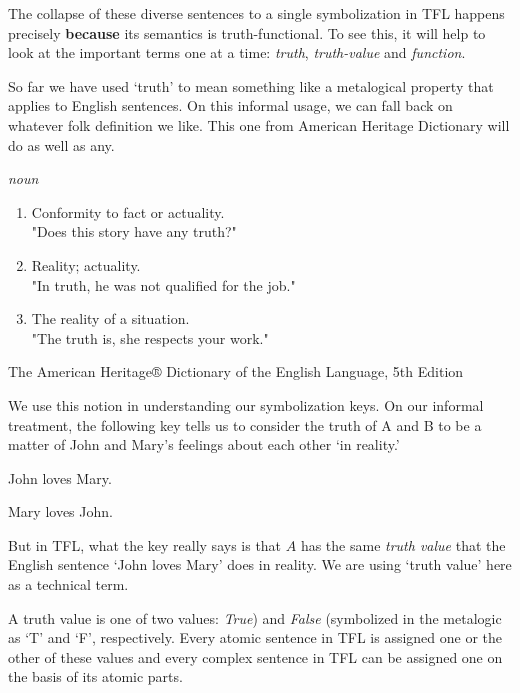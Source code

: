 The collapse of these diverse sentences to a single symbolization in TFL happens
precisely \textbf{because} its semantics is truth-functional. To see this, it will
help to look at the important terms one at a time: \emph{truth}, \emph{truth-value}
and \emph{function}.

So far we have used `truth' to mean something like a metalogical property that applies to
English sentences. On this informal usage, we can fall back on whatever folk definition we
like. This one from American Heritage Dictionary will do as well as any.

\begin{definition} \emph{noun}
  \begin{enumerate}
  \item Conformity to fact or actuality. \\ "Does this story have any truth?"
  \item Reality; actuality. \\ "In truth, he was not qualified for the job."
  \item The reality of a situation. \\ "The truth is, she respects your work."
  \end{enumerate}
  The American Heritage® Dictionary of the English Language, 5th Edition 
\end{definition}

We use this notion in understanding our symbolization keys. On our informal
treatment, the following key tells us to consider the truth of A and B to be a
matter of John and Mary's feelings about each other `in reality.'

\begin{argument}
\item[A:] John loves Mary.
\item[B:] Mary loves John.
\end{argument}

But in TFL, what the key really says is that $A$ has the same \emph{truth value}
that the English sentence `John loves Mary' does in reality. We are using `truth
value' here as a technical term.

\begin{definition}
  A truth value is one of two values: \emph{True}) and \emph{False} (symbolized
  in the metalogic as `T' and `F', respectively. Every atomic sentence in TFL is
  assigned one or the other of these values and every complex sentence in TFL can
  be assigned one on the basis of its atomic parts.
\end{definition}

